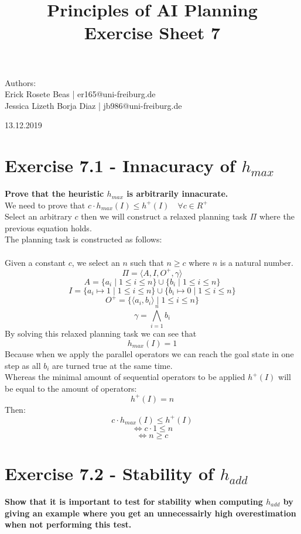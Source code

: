 \documentclass[12pt,a4paper]{article}
\title{\textbf{Principles of AI Planning
		\\{\Large Exercise Sheet 7}}}
\begin{document}
\begin{flushleft}
	Authors:\\
	Erick Rosete Beas | er165@uni-freiburg.de\\
	Jessica Lizeth Borja Diaz | jb986@uni-freiburg.de\\
\end{flushleft}
{\let\newpage\relax\maketitle}
\begin{center} 
	\large 13.12.2019 
\end{center}

\section*{Exercise 7.1 - Innacuracy of $h_{max}$}
\textbf{Prove that the heuristic $h_{max}$ is arbitrarily innacurate.}\\
We need to prove that $c \cdot h_{max}(I) \leq h^+(I) \quad \forall c \in R^+$ \\
Select an arbitrary $c$ then we will construct a relaxed planning task $\Pi$ 
where the previous equation holds.\\
The planning task is constructed as follows:\\\\
Given a constant $c$, we select an 
$n$ such that $n \geq c$ where $n$ is a natural number.
\[\Pi = \langle A, I, O^+, \gamma \rangle \]
\[A = \{a_i \mid 1 \leq i \leq n \} \cup \{b_i \mid 1 \leq i \leq n \} \]
\[I = \{ a_i \mapsto 1 \mid 1 \leq i \leq n \} \cup
	  \{ b_i \mapsto 0 \mid 1 \leq i \leq n \} \]
\[O^+ = \{ \langle a_i, b_i \rangle \mid 1 \leq i \leq n  \}\]
\[\gamma = \bigwedge\limits_{i=1}^n b_i \]
By solving this relaxed planning task we can see that\\
\[h_{max}(I) = 1\]
Because when we apply the parallel operators we can reach the goal 
state in one step as all $b_i$ are turned true at the same time.\\
Whereas the minimal amount of sequential operators to be applied 
$h^+(I)$ will be equal to the amount of operators:
\[h^+(I)=n\]
Then:
\[ c \cdot h_{max}(I) \leq h^+(I) \]
\[ \iff c \cdot 1 \leq n \]
\[ \iff n \geq c\]

\section*{Exercise 7.2 - Stability of $h_{add}$ }
\textbf{Show that it is important to test for stability when computing $h_{add}$
by giving an example where you get an unnecessairly high overestimation
when not performing this test.}\\
\end{document}
